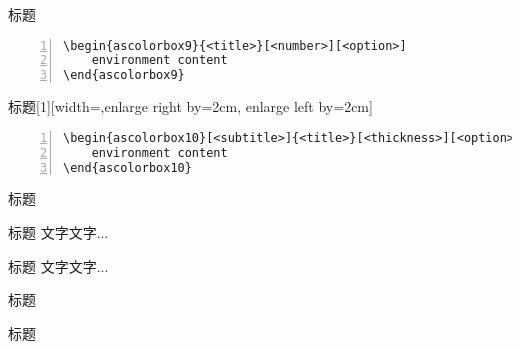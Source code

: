 \documentclass[a4]{ctexart}
\begin{document}
\begin{ascolorbox9}{标题}
    \zhlipsum[1]
\end{ascolorbox9}
\begin{lstlisting}[backgroundcolor=\color{gray!5},framerule=1pt,frame=tb,numbers=left,
    numberstyle=\tiny\color{black},]
\begin{ascolorbox9}{<title>}[<number>][<option>]
    environment content
\end{ascolorbox9}
\end{lstlisting}

\begin{ascolorbox10}[子标题]{标题}[1][width=\linewidth-4cm,enlarge right by=2cm, enlarge left by=2cm]
    \zhlipsum[1]
\end{ascolorbox10}
\begin{lstlisting}[backgroundcolor=\color{gray!5},framerule=1pt,frame=tb,numbers=left,
    numberstyle=\tiny\color{black},]
\begin{ascolorbox10}[<subtitle>]{<title>}[<thickness>][<option>]
    environment content
\end{ascolorbox10}
\end{lstlisting}

\begin{ascolorbox11}[子标题]{标题}
    \zhlipsum[1]
\end{ascolorbox11}
\begin{tcblisting}{}
\begin{ascolorbox11}[子标题]{标题}
    文字文字...
\end{ascolorbox11}
\end{tcblisting}

\begin{tcblisting}{}
\begin{ascolorbox12}[子标题]{标题}
    文字文字...
\end{ascolorbox12}
\end{tcblisting}

\begin{tcblisting}{}
\begin{ascolorbox13}[子标题]{标题}
    \zhlipsum[1]{}
\end{ascolorbox13}
\end{tcblisting}

\begin{tcblisting}{}
\begin{ascolorbox16}{标题}
    \zhlipsum[1]{}
\end{ascolorbox16}
\end{tcblisting}
\end{document}
